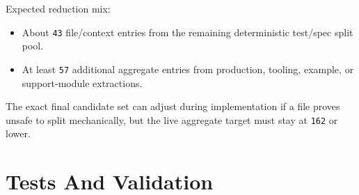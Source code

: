 Expected reduction mix:

\begin{itemize}
\tightlist
\item
  About \texttt{4\allowbreak{}3} file/context entries from the remaining deterministic test/spec split pool.
\item
  At least \texttt{5\allowbreak{}7} additional aggregate entries from production, tooling, example, or support-module extractions.
\end{itemize}

The exact final candidate set can adjust during implementation if a file proves unsafe to split mechanically, but the live aggregate target must stay at \texttt{1\allowbreak{}6\allowbreak{}2} or lower.

\section{Tests And Validation}\label{record-244-tests-and-validation}

